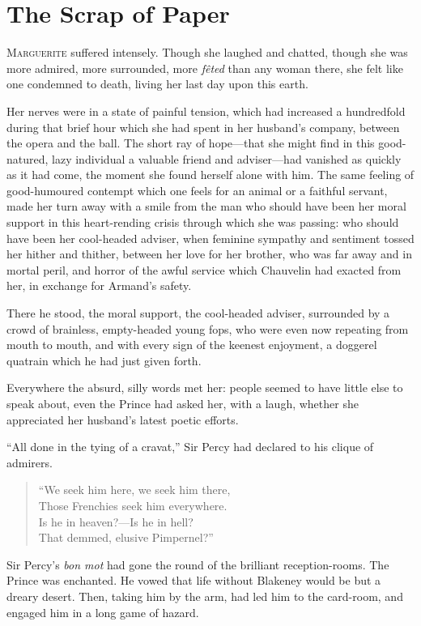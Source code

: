
\chapter{The Scrap of Paper}
\lettrine[lines=4]{M}{arguerite} suffered intensely. Though she laughed and chatted, though she was more admired, more surrounded, more \textit{fêted} than any woman there, she felt like one condemned to death, living her last day upon this earth.

Her nerves were in a state of painful tension, which had increased a hundredfold during that brief hour which she had spent in her husband's company, between the opera and the ball. The short ray of hope---that she might find in this good-natured, lazy individual a valuable friend and adviser---had vanished as quickly as it had come, the moment she found herself alone with him. The same feeling of good-humoured contempt which one feels for an animal or a faithful servant, made her turn away with a smile from the man who should have been her moral support in this heart-rending crisis through which she was passing: who should have been her cool-headed adviser, when feminine sympathy and sentiment tossed her hither and thither, between her love for her brother, who was far away and in mortal peril, and horror of the awful service which Chauvelin had exacted from her, in exchange for Armand's safety.

There he stood, the moral support, the cool-headed adviser, surrounded by a crowd of brainless, empty-headed young fops, who were even now repeating from mouth to mouth, and with every sign of the keenest enjoyment, a doggerel quatrain which he had just given forth.

Everywhere the absurd, silly words met her: people seemed to have little else to speak about, even the Prince had asked her, with a laugh, whether she appreciated her husband's latest poetic efforts.

\enquote{All done in the tying of a cravat,} Sir Percy had declared to his clique of admirers.

\blockquote{
\enquote{We seek him here, we seek him there,\\
Those Frenchies seek him everywhere.\\
Is he in heaven?---Is he in hell?\\
That demmed, elusive Pimpernel?}
}

Sir Percy's \textit{bon mot} had gone the round of the brilliant reception-rooms. The Prince was enchanted. He vowed that life without Blakeney would be but a dreary desert. Then, taking him by the arm, had led him to the card-room, and engaged him in a long game of hazard.


